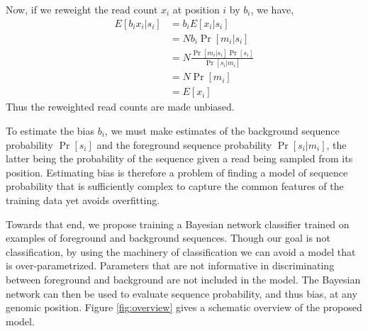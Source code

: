 \documentclass{bioinfo}
\begin{document}
Now, if we reweight the read count $x_i$ at position $i$ by $b_i$, we
have,
\begin{align*}
E[ b_i x_i | s_i ] &= b_i E[ x_i | s_i ] \\
&= N b_i \Pr[ m_i | s_i ] \\
&= N \frac{ \Pr[ m_i | s_i ] \Pr[ s_i ] }{ \Pr[ s_i | m_i ] } \\
&= N \Pr[ m_i ] \\
&= E[ x_i ]
\end{align*}
Thus the reweighted read counts are made unbiased.

To estimate the bias $b_i$, we must make estimates of the background sequence
probability $\Pr[s_i]$ and the foreground sequence probability $\Pr[ s_i | m_i
]$, the latter being the probability of the sequence given a read being sampled
from its position. Estimating bias is therefore a problem of finding a model of
sequence probability that is sufficiently complex to capture the common features
of the training data yet avoids overfitting.

Towards that end, we propose training a Bayesian network classifier trained on
examples of foreground and background sequences. Though our goal is not
classification, by using the machinery of classification we can avoid a model
that is over-parametrized. Parameters that are not informative in
discriminating between foreground and background are not included in the model.
The Bayesian network can then be used to evaluate sequence probability, and thus
bias, at any genomic position. Figure \ref{fig:overview} gives a schematic overview
of the proposed model.
\end{document}
